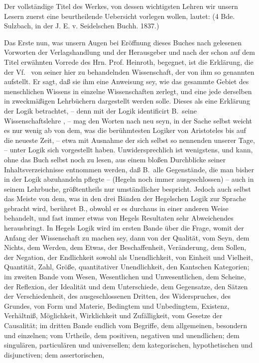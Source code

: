 \clearpage\ifnackt\else\linenumbers\fi%
\thispagestyle{ctplain}\noindent{}
Der vollständige Titel des Werkes, von dessen wichtigsten Lehren wir unsern Lesern zuerst eine beurtheilende Uebersicht vorlegen wollen, lautet:  (4 Bde. Sulzbach, in der J. E. v. Seidelschen Buchh. 1837.)\par
Das Erste nun, was unsern Augen bei Eröffnung dieses Buches nach gelesenen Vorworten der Verlagshandlung und der Herausgeber und nach der schon auf dem Titel erwähnten Vorrede des Hrn. Prof. Heinroth, begegnet, ist die Erklärung, die der Vf.\  von seiner hier zu behandelnden Wissenschaft, der von ihm so genannten  aufstellt. Er sagt, daß sie ihm eine Anweisung sey, wie das gesammte Gebiet des menschlichen Wissens in einzelne Wissenschaften zerlegt, und eine jede derselben in zweckmäßigen Lehrbüchern dargestellt werden solle. Dieses als eine Erklärung der Logik betrachtet, -- denn mit der Logik identificirt B.\ seine Wissenschaftslehre , -- mag den Worten nach neu seyn, in der Sache selbst weicht es nur wenig ab von dem, was die berühmtesten Logiker von Aristoteles bis auf die neueste Zeit, -- etwa mit Ausnahme der sich selbst so nennenden  unserer Tage, -- unter Logik sich vorgestellt haben. Unwidersprechlich ist wenigstens, und kann, ohne das Buch selbst noch zu lesen, aus einem bloßen Durchblicke seiner Inhaltsverzeichnisse entnommen werden, daß B.\ alle Gegenstände, die man bisher in der Logik abzuhandeln pflegte -- (Hegeln noch immer ausgeschlossen) -- auch in seinem Lehrbuche, größtentheils nur umständlicher bespricht. Jedoch auch selbst das Meiste von dem, was in den drei Bänden der Hegelschen Logik zur Sprache gebracht wird, berühret B., obwohl er es durchaus in einer anderen  Weise behandelt, und fast immer etwas von Hegels Resultaten sehr Abweichendes herausbringt. In Hegels Logik wird im ersten Bande über die Frage, womit der Anfang der Wissenschaft zu machen sey, dann von der Qualität, vom Seyn, dem Nichts, dem Werden, dem Etwas, der Beschaffenheit, Veränderung, dem Sollen, der Negation, der Endlichkeit sowohl als Unendlichkeit, von Einheit und Vielheit, Quantität, Zahl, Größe, quantitativer Unendlichkeit, den Kantschen Kategorien; im zweiten Bande vom Wesen, Wesentlichen und Unwesentlichen, dem Scheine, der Reflexion, der Idealität und dem Unterschiede, dem Gegensatze, den Sätzen der Verschiedenheit, des ausgeschlossenen Dritten, des Widerspruches, des Grundes, von Form und Materie, Bedingtem und Unbedingtem, Existenz, Verhältniß, Möglichkeit, Wirklichkeit und Zufälligkeit, vom Gesetze der Causalität; im dritten Bande endlich vom Begriffe, dem allgemeinen, besondern und einzelnen; vom Urtheile, dem positiven, negativen und unendlichen; dem singulären, particulären und universellen; dem kategorischen, hypothetischen und disjunctiven; dem assertorischen, 